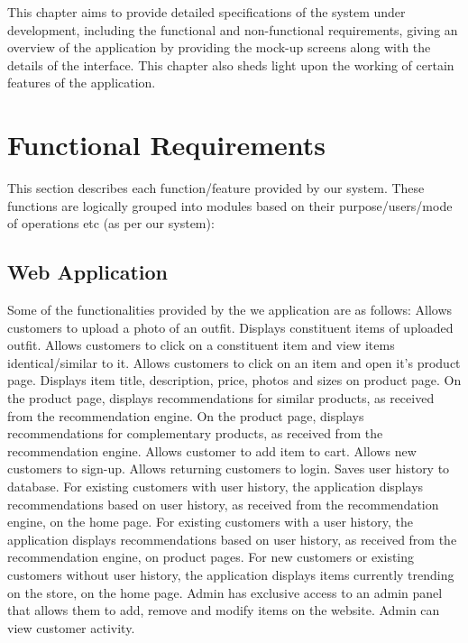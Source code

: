 This chapter aims to provide detailed specifications of the system under development, including the functional and non-functional requirements, giving an overview of the application by providing the mock-up screens along with the details of the interface. This chapter also sheds light upon the working of certain features of the application. 

\section{Functional Requirements}

This section describes each function/feature provided by our system. These functions are logically grouped into modules based on their purpose/users/mode of operations etc (as per our system):
\begin{outline}
  \subsection{Web Application}
  Some of the functionalities provided by the we application are as follows:
  \1 Allows customers to upload a photo of an outfit.
  \1 Displays constituent items of uploaded outfit.
  \1 Allows customers to click on a constituent item and view items identical/similar to it.
  \1 Allows customers to click on an item and open it's product page.
  \1 Displays item title, description, price, photos and sizes on product page.
  \1 On the product page, displays recommendations for similar products, as received from the recommendation engine.
  \1 On the product page, displays recommendations for complementary products, as received from the recommendation engine.
  \1 Allows customer to add item to cart.
  \1 Allows new customers to sign-up.
  \1 Allows returning customers to login.
  \1 Saves user history to database.
  \1 For existing customers with user history, the application displays recommendations based on user history, as received from the recommendation engine, on the home page.
  \1 For existing customers with a user history, the application displays recommendations based on user history, as received from the recommendation engine, on product pages.
  \1 For new customers or existing customers without user history, the application displays items currently trending on the store, on the home page.
  \1 Admin has exclusive access to an admin panel that allows them to add, remove and modify items on the website. 
  \1 Admin can view customer activity.
\end{outline}
